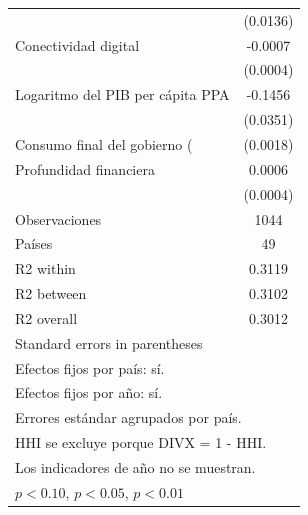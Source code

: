 \begin{table}[htbp]
\begin{tabular}{l*{1}{c}}
                    &    (0.0136)         \\
\addlinespace
Conectividad digital&     -0.0007\sym{**} \\
                    &    (0.0004)         \\
\addlinespace
Logaritmo del PIB per cápita PPA&     -0.1456\sym{***}\\
                    &    (0.0351)         \\
\addlinespace
Consumo final del gobierno (%
                    &    (0.0018)         \\
\addlinespace
Profundidad financiera&      0.0006         \\
                    &    (0.0004)         \\
\midrule
Observaciones       &        1044         \\
Países              &          49         \\
R2 within           &      0.3119         \\
R2 between          &      0.3102         \\
R2 overall          &      0.3012         \\
\bottomrule
\multicolumn{2}{l}{\footnotesize Standard errors in parentheses}\\
\multicolumn{2}{l}{\footnotesize Efectos fijos por país: sí.}\\
\multicolumn{2}{l}{\footnotesize Efectos fijos por año: sí.}\\
\multicolumn{2}{l}{\footnotesize Errores estándar agrupados por país.}\\
\multicolumn{2}{l}{\footnotesize HHI se excluye porque DIVX = 1 - HHI.}\\
\multicolumn{2}{l}{\footnotesize Los indicadores de año no se muestran.}\\
\multicolumn{2}{l}{\footnotesize \sym{*} \(p<0.10\), \sym{**} \(p<0.05\), \sym{***} \(p<0.01\)}\\
\end{tabular}
\end{table}
